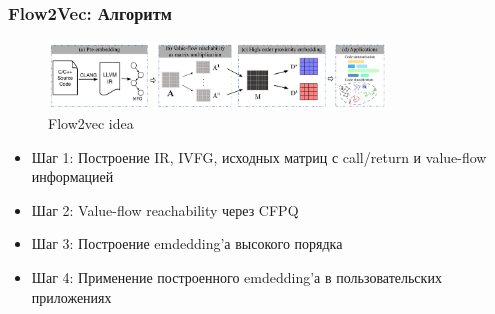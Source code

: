\documentclass[xcolor=table,english]{beamer}
\begin{document}
\begin{frame}[fragile] \frametitle{Flow2Vec: Алгоритм}
    \begin{minipage}[m]{\linewidth}
        \begin{figure}
            \centering
            \includegraphics[width=0.8\textwidth]{figures/flow2vec_idea.png}
            \caption{Flow2vec idea}
            \label{fig:flow2vec_idea}
        \end{figure}
    \end{minipage}\hfill
    \begin{minipage}[m]{\linewidth}
        \begin{itemize}
            \item Шаг 1: Построение IR, IVFG, исходных матриц с call/return и value-flow информацией
            \item Шаг 2: Value-flow reachability через CFPQ
            \item Шаг 3: Построение emdedding'а высокого порядка
            \item Шаг 4: Применение построенного emdedding'а в пользовательских приложениях
        \end{itemize}
    \end{minipage}
\end{frame}
\end{document}
